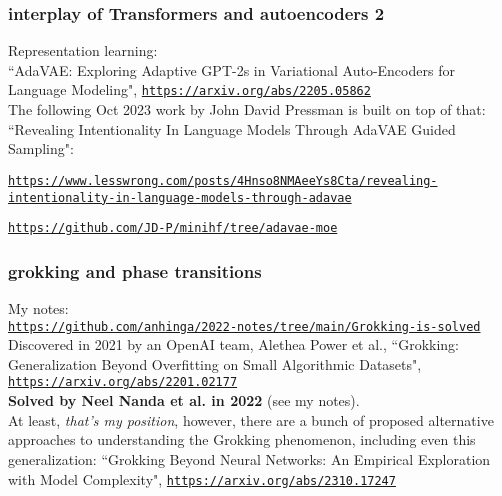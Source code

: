 \documentclass{beamer}
\begin{document}
\begin{frame}

  \frametitle{interplay of Transformers and autoencoders 2}

Representation learning:\\[2ex]

``AdaVAE: Exploring Adaptive GPT-2s in Variational Auto-Encoders for Language Modeling",
\href{https://arxiv.org/abs/2205.05862}{\tt\small https://arxiv.org/abs/2205.05862}\\[2ex]

The following Oct 2023 work by John David Pressman is built on top of that:
``Revealing Intentionality In Language Models Through AdaVAE Guided Sampling":\\[0.5ex]

\begin{minipage}{\linewidth}
\hspace{-0.2in}
\href{https://www.lesswrong.com/posts/4Hnso8NMAeeYs8Cta/revealing-intentionality-in-language-models-through-adavae}{\tt\tiny https://www.lesswrong.com/posts/4Hnso8NMAeeYs8Cta/revealing-intentionality-in-language-models-through-adavae}
\end{minipage}
\href{https://github.com/JD-P/minihf/tree/adavae-moe}{\tt\tiny https://github.com/JD-P/minihf/tree/adavae-moe}


\end{frame}

\begin{frame}

  \frametitle{grokking and phase transitions}

My notes:\\[2ex]

\href{https://github.com/anhinga/2022-notes/tree/main/Grokking-is-solved}{\tt\footnotesize https://github.com/anhinga/2022-notes/tree/main/Grokking-is-solved}\\[2ex]

Discovered in 2021 by an OpenAI team, Alethea Power et al., ``Grokking: Generalization Beyond Overfitting on Small Algorithmic Datasets",
\href{https://arxiv.org/abs/2201.02177}{\tt\small https://arxiv.org/abs/2201.02177}\\[2ex]

{\bf Solved by Neel Nanda et al. in 2022} (see my notes).\\[2ex]

At least, {\em that's my position}, however, there are a bunch of proposed alternative approaches to understanding the Grokking phenomenon,
including even this generalization: ``Grokking Beyond Neural Networks: An Empirical Exploration with Model Complexity",
\href{https://arxiv.org/abs/2310.17247}{\tt\small https://arxiv.org/abs/2310.17247}

\end{frame}
\end{document}
